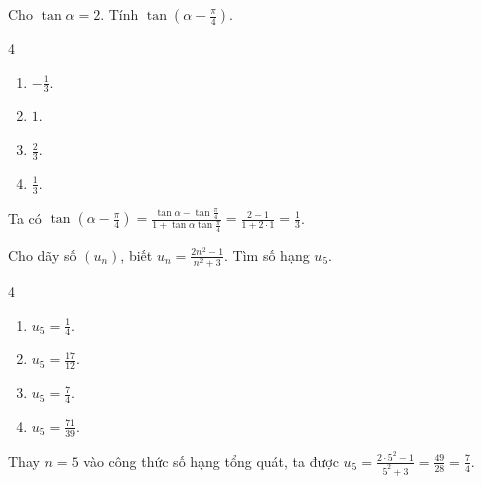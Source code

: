 \begin{baitap}
	Cho $\tan \alpha = 2$. Tính $\tan \left(\alpha - \frac{\pi}{4}\right)$.
	\begin{multicols}{4}
		\begin{enumerate}
			\item $-\frac{1}{3}$.
			\item $1$.
			\item $\frac{2}{3}$.
			\item $\frac{1}{3}$.
		\end{enumerate}
	\end{multicols}
	\begin{traloi}
		Ta có $\tan \left(\alpha - \frac{\pi}{4}\right) = \frac{\tan \alpha - \tan \frac{\pi}{4}}{1 + \tan \alpha \tan \frac{\pi}{4}} = \frac{2 - 1}{1 + 2 \cdot 1} = \frac{1}{3}$.
	\end{traloi}
\end{baitap}

\begin{baitap}
	Cho dãy số $(u_n)$, biết $u_n = \frac{2n^2 - 1}{n^2 + 3}$. Tìm số hạng $u_5$.
	\begin{multicols}{4}
		\begin{enumerate}
			\item $u_5 = \frac{1}{4}$.
			\item $u_5 = \frac{17}{12}$.
			\item $u_5 = \frac{7}{4}$.
			\item $u_5 = \frac{71}{39}$.
		\end{enumerate}
	\end{multicols}
	\begin{traloi}
		\dapan{C}
		Thay $n = 5$ vào công thức số hạng tổng quát, ta được $u_5 = \frac{2 \cdot 5^2 - 1}{5^2 + 3} = \frac{49}{28} = \frac{7}{4}$.
	\end{traloi}
\end{baitap}

